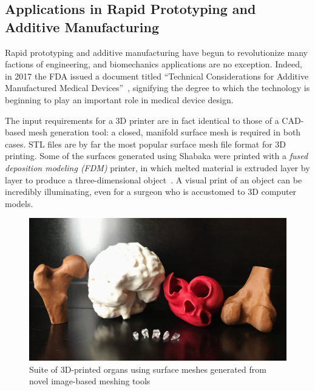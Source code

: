\subsection[Applications in Rapid Prototyping and Additive Manufacturing]{\texorpdfstring{Applications in Rapid Prototyping and Additive \newline Manufacturing}{Applications in Rapid Prototyping and Additive \newline Manufacturing}}
\label{Applications in Rapid Prototyping and Additive Manufacturing}

Rapid prototyping and additive manufacturing have begun to revolutionize many factions of engineering, and biomechanics applications are no exception. Indeed, in 2017 the FDA issued a document titled ``Technical Considerations for Additive Manufactured Medical Devices''~\cite{fda3_2016}, signifying the degree to which the technology is beginning to play an important role in medical device design.

The input requirements for a 3D printer are in fact identical to those of a CAD-based mesh generation tool: a closed, manifold surface mesh is required in both cases. STL files are by far the most popular surface mesh file format for 3D printing. Some of the surfaces generated using Shabaka were printed with a \textit{fused deposition modeling (FDM)} printer, in which melted material is extruded layer by layer to produce a three-dimensional object~. A visual print of an object can be incredibly illuminating, even for a surgeon who is accustomed to 3D computer models.

\begin{figure}
\centering
		\includegraphics[width=1.0\textwidth]{media/6-3dprint/3dprint.jpg}
%
\caption{Suite of 3D-printed organs using surface meshes generated from novel image-based meshing tools}
\label{fig:3dprint}
\end{figure}

